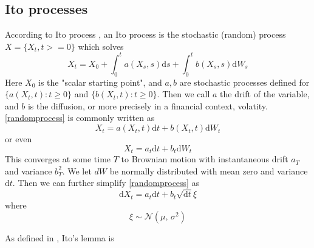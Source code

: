 \documentclass[11pt]{article} %
\begin{document}
\subsection{Ito processes}

According to Ito process \cite{itoprocess}, an Ito process is the stochastic (random) 
process $X = \{X_t, t>=0\}$ which solves 
\begin{equation} \label{randomprocess}
X_t = X_0 + \int_{0}^{t} a(X_s, s)\mathrm{d}s + 
\int_{0}^{t} b(X_s, s) \mathrm{d}W_s
\end{equation}
Here $X_0$ is the "scalar starting point", and $a,b$ are stochastic 
processes defined for $\{a(X_t, t) : t\geq0\} $ and $\{b(X_t, t) : t\geq0\}$. 
Then we call $a$ the drift of the variable, and $b$ is the diffusion, 
or more precisely in a financial context, volatity. \ref{randomprocess} is commonly 
written as 
\begin{equation}
    X_t = a(X_t, t)\mathrm{d}t + b(X_t, t)\mathrm{d}W_t
\end{equation}
or even 
\begin{equation} \label{itoprocess}
    X_t = a_t\mathrm{d}t + b_t\mathrm{d}W_t
\end{equation}
This converges at some time $T$ to Brownian motion with instantaneous drift $a_T$ and
variance $b_T^2$. We let $dW$ be normally distributed with mean zero and variance 
$\mathrm{d}t$. Then we can further simplify \ref{randomprocess} as 
\begin{equation}
    \mathrm{d}X_t = a_t\mathrm{d}t + b_t \sqrt{\mathrm{d}t}\xi
\end{equation}
where
\begin{equation}
    \xi \sim \mathcal{N}(\mu,\,\sigma^{2})
\end{equation}

As defined in \cite{itoprocess}, Ito's lemma is 
\end{document}
